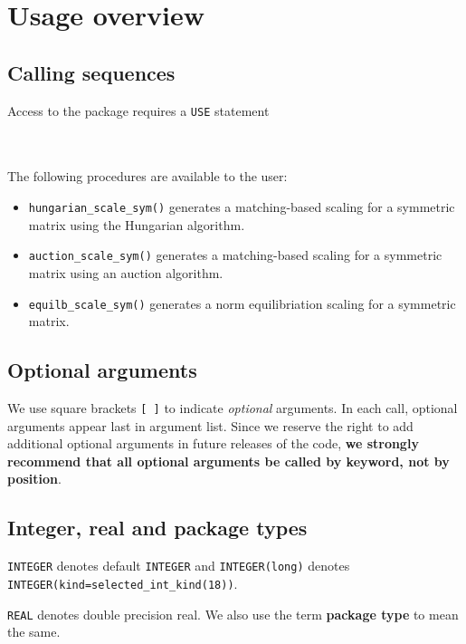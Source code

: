 \section{Usage overview}

\subsection{Calling sequences}

Access to the package requires a {\tt USE} statement \\ \\
\indent\hspace{8mm}{\tt use spral\_scaling} \\

\medskip

\noindent
The following procedures are available to the user:
\begin{itemize}
\item {\tt hungarian\_scale\_sym()} generates a matching-based scaling for a symmetric matrix using the Hungarian algorithm.
\item {\tt auction\_scale\_sym()} generates a matching-based scaling for a symmetric matrix using an auction algorithm.
\item {\tt equilb\_scale\_sym()} generates a norm equilibriation scaling for a symmetric matrix.
\end{itemize}

\subsection{Optional arguments}\label{Optional arguments}

We use square brackets {\tt [ ]} to indicate {\it optional} arguments.
In each
call, optional arguments appear last in argument list.  Since we
reserve the right to add additional optional arguments in future
releases of the code, {\bf we strongly recommend that all optional
arguments be called by keyword, not by position}.

\subsection{Integer, real and package types}\label{Integer kinds}

{\tt INTEGER} denotes default {\tt INTEGER} and
{\tt INTEGER(long)} denotes {\tt INTEGER(kind=selected\_int\_kind(18))}.

\noindent
{\tt REAL} denotes double precision real.
We also use the term {\bf package type} to mean the same.

